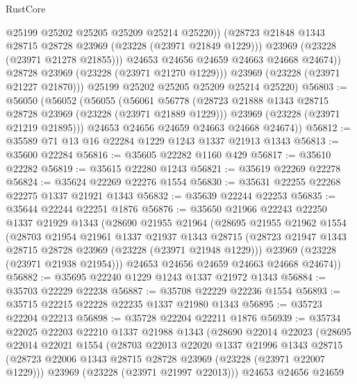 \begin{lexlean}{RustCore}
\begin{coremodule}
                    @25199
                    @25202
                    @25205
                    @25209
                    @25214
                    @25220))
                (@28723 @21848 @1343 @28715 @28728 @23969 (@23228 (@23971 @21849 @1229)))
                @23969
                (@23228 (@23971 @21278 @21855)))
              @24653
              @24656
              @24659
              @24663
              @24668
              @24674))
          @28728
          @23969
          (@23228 (@23971 @21270 @1229)))
        @23969
        (@23228 (@23971 @21227 @21870)))
      @25199
      @25202
      @25205
      @25209
      @25214
      @25220)
@56803 := @56050
    (@56052
      (@56055
        (@56061
          @56778
          (@28723 @21888 @1343 @28715 @28728 @23969 (@23228 (@23971 @21889 @1229)))
          @23969
          (@23228 (@23971 @21219 @21895)))
        @24653
        @24656
        @24659
        @24663
        @24668
        @24674))
@56812 := @35589 @71 @13 @16 @22284 @1229 @1243 @1337 @21913 @1343
@56813 := @35600 @22284
@56816 := @35605 @22282 @1160 @429
@56817 := @35610 @22282
@56819 := @35615 @22280 @1243
@56821 := @35619 @22269 @22278
@56824 := @35624 @22269 @22276 @1554
@56830 := @35631 @22255 @22268 @22275 @1337 @21921 @1343
@56832 := @35639 @22244 @22253
@56835 := @35644 @22244 @22251 @1876
@56876 := @35650
    @21966
    @22243
    @22250
    @1337
    @21929
    @1343
    (@28690
      @21955
      @21964
      (@28695
        @21955
        @21962
        @1554
        (@28703
          @21954
          @21961
          @1337
          @21937
          @1343
          @28715
          (@28723 @21947 @1343 @28715 @28728 @23969 (@23228 (@23971 @21948 @1229)))
          @23969
          (@23228 (@23971 @21938 @21954)))
        @24653
        @24656
        @24659
        @24663
        @24668
        @24674))
@56882 := @35695 @22240 @1229 @1243 @1337 @21972 @1343
@56884 := @35703 @22229 @22238
@56887 := @35708 @22229 @22236 @1554
@56893 := @35715 @22215 @22228 @22235 @1337 @21980 @1343
@56895 := @35723 @22204 @22213
@56898 := @35728 @22204 @22211 @1876
@56939 := @35734
    @22025
    @22203
    @22210
    @1337
    @21988
    @1343
    (@28690
      @22014
      @22023
      (@28695
        @22014
        @22021
        @1554
        (@28703
          @22013
          @22020
          @1337
          @21996
          @1343
          @28715
          (@28723 @22006 @1343 @28715 @28728 @23969 (@23228 (@23971 @22007 @1229)))
          @23969
          (@23228 (@23971 @21997 @22013)))
        @24653
        @24656
        @24659

\end{coremodule}
\end{lexlean}
